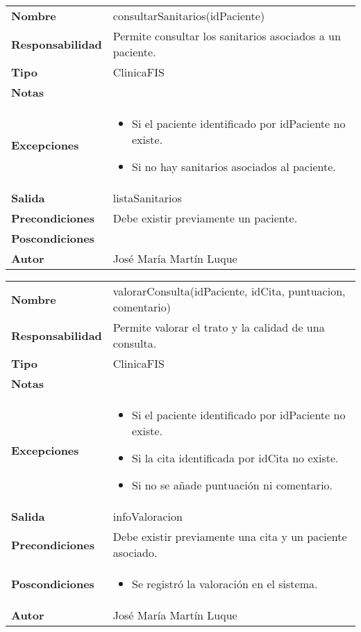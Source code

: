 \documentclass[11pt,a4paper]{article}
\newenvironment{itemizenomargins}
    {\begin{minipage}[t]{1\linewidth}\begin{itemize}}
    {\end{itemize}\end{minipage}}
\begin{document}
\begin{table}[H]
	\centering
	\label{anular-cita}
	\begin{tabularx}{\textwidth}{l|X}
    \textbf{Nombre}          & consultarSanitarios(idPaciente)\\
		\textbf{Responsabilidad} & Permite consultar los sanitarios asociados a un paciente. \\
		\textbf{Tipo}            & ClinicaFIS \\
		\textbf{Notas}           &  \\
		\textbf{Excepciones}     & 
		\begin{itemizenomargins}
			\item Si el paciente identificado por idPaciente no existe.
      \item Si no hay sanitarios asociados al paciente.
		\end{itemizenomargins} \\
		\textbf{Salida}          &  listaSanitarios\\
		\textbf{Precondiciones}  &  Debe existir previamente un paciente.\\
		\textbf{Poscondiciones}  & \\
		\textbf{Autor}			 & José María Martín Luque
	\end{tabularx}
\end{table}


\begin{table}[H]
	\centering
	\label{anular-cita}
	\begin{tabularx}{\textwidth}{l|X}
    \textbf{Nombre}          & valorarConsulta(idPaciente, idCita, puntuacion, comentario)\\
		\textbf{Responsabilidad} & Permite valorar el trato y la calidad de una consulta. \\
		\textbf{Tipo}            & ClinicaFIS \\
		\textbf{Notas}           &  \\
		\textbf{Excepciones}     & 
		\begin{itemizenomargins}
			\item Si el paciente identificado por idPaciente no existe.
      \item Si la cita identificada por idCita no existe.
      \item Si no se añade puntuación ni comentario.
		\end{itemizenomargins} \\
		\textbf{Salida}          &  infoValoracion\\
		\textbf{Precondiciones}  &  Debe existir previamente una cita y un paciente asociado.\\
		\textbf{Poscondiciones}  & 
		\begin{itemizenomargins}
			\item Se registró la valoración en el sistema.
		\end{itemizenomargins} \\
		\textbf{Autor}			 & José María Martín Luque
	\end{tabularx}
\end{table}
\end{document}
